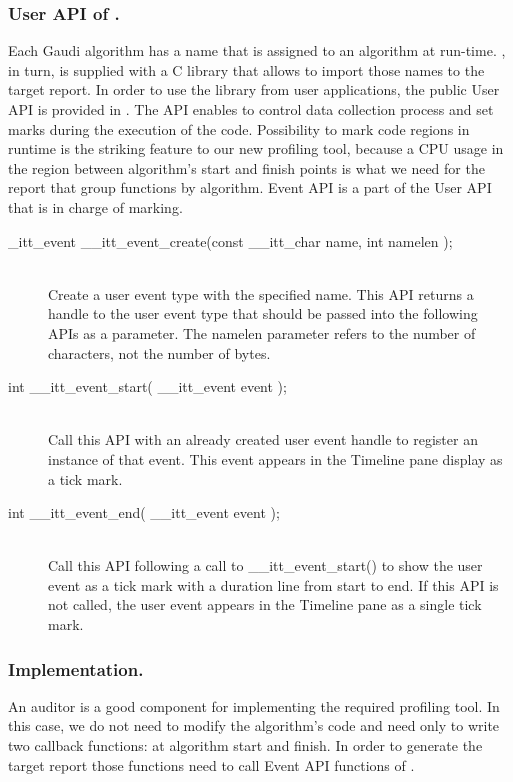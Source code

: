 \documentclass[a4paper]{jpconf}
\begin{document}
\subsubsection{User API of \iamp.}

Each Gaudi algorithm has a name that is assigned to an algorithm at run-time. \amp, in turn, is supplied with 
a C library that allows to import those names to the target report. In order to use the library from user applications, 
the public User API is provided in \amp. The API enables to control data collection process and set marks during 
the execution of the code. Possibility to mark code regions in runtime is the striking feature 
to our new profiling tool, because a CPU usage in the region between algorithm’s start and finish points is what we 
need for the report that group functions by algorithm. 
Event API is a part of the User API  that is in charge of marking.

\begin{description}
\item[\_itt\_event \_\_itt\_event\_create(const \_\_itt\_char \*name, int namelen );] \hfill \\
Create a user event type with the specified name. This API returns a handle to the user event type that should be 
passed into the following APIs as a parameter. The namelen parameter refers to the number of characters, 
not the number of bytes.

\item[int \_\_itt\_event\_start( \_\_itt\_event event );] \hfill \\
Call this API with an already created user event handle to register an instance of that event. This event appears 
in the Timeline pane display as a tick mark.

\item[int \_\_itt\_event\_end( \_\_itt\_event event );] \hfill \\
Call this API following a call to \_\_itt\_event\_start() to show the user event as a tick mark with a duration line 
from start to end. If this API is not called, the user event appears in the Timeline pane as a single tick mark.
\end{description}

\subsubsection{Implementation.}

An auditor is a good component for implementing the required profiling tool. In this case, we do not need to modify 
the algorithm’s code and need only to write two callback functions: at algorithm start and finish. In order to generate 
the target report those functions need to call Event API functions of \amp.
\end{document}
